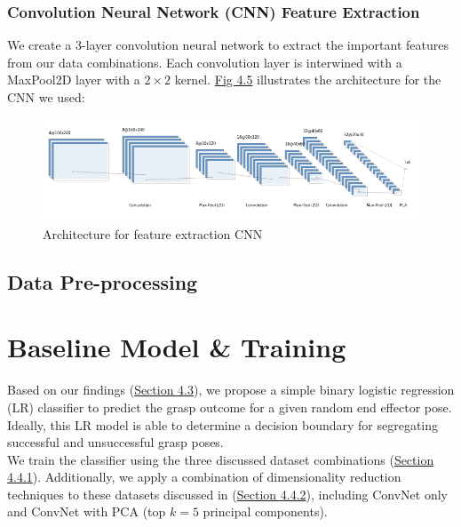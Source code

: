\documentclass[11pt, a4paper]{report}
\theoremstyle{definition}
\begin{document}
\subsubsection{Convolution Neural Network (CNN) Feature Extraction}
\label{sec:4.4.2.2}
We create a 3-layer convolution neural network to extract the important features from our data combinations. Each convolution layer is interwined with a MaxPool2D layer with a $2\times2$ kernel. \hyperref[fig:4.5]{Fig 4.5} illustrates the architecture for the CNN we used:
\begin{figure}[H]
    \includegraphics[scale=0.7]{docs/Project Report/Media/nn.png}
    \caption{Architecture for feature extraction CNN}
    \label{fig:4.5}
\end{figure}


\subsection{Data Pre-processing}
\label{sec:4.4.3}



\section{Baseline Model \& Training}
\label{sec:4.5}
Based on our findings (\hyperref[sec:4.3]{Section 4.3}), we propose a simple binary logistic regression (LR) classifier to predict the grasp outcome for a given random end effector pose. Ideally, this LR model is able to determine a decision boundary for segregating successful and unsuccessful grasp poses.\\

We train the classifier using the three discussed dataset combinations (\hyperref[sec:4.4.1]{Section 4.4.1}). Additionally, we apply a combination of dimensionality reduction techniques to these datasets discussed in (\hyperref[sec:4.4.2]{Section 4.4.2}), including ConvNet only and ConvNet with PCA (top $k=5$ principal components).
\end{document}
